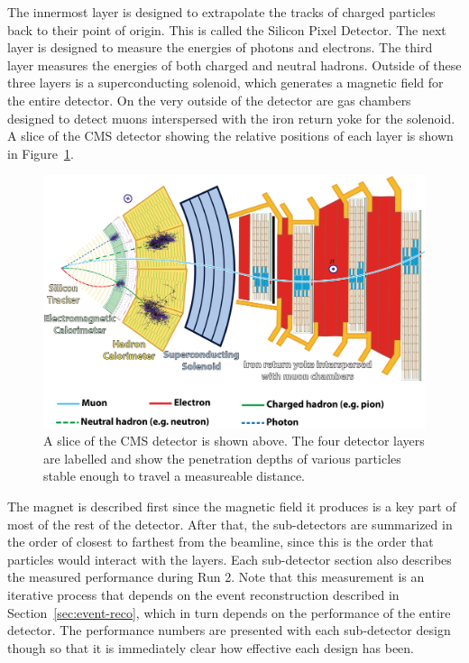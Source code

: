 The innermost layer is designed to extrapolate the tracks of charged particles
back to their point of origin.
This is called the Silicon Pixel Detector.
The next layer is designed to measure the energies of photons and electrons.
The third layer measures the energies of both charged and neutral hadrons.
Outside of these three layers is a superconducting solenoid,
which generates a magnetic field for the entire detector.
On the very outside of the detector are gas chambers designed to detect muons
interspersed with the iron return yoke for the solenoid.
A slice of the CMS detector showing the relative positions of each layer
is shown in Figure~\ref{fig:slice}.
\begin{figure}
  \centering
  \includegraphics[width=0.9\linewidth]{figures/CMSslice_whiteBackground.png}
  \caption[CMS detector slice]{
    A slice of the CMS detector is shown above\cite{Barney:2120661}.
    The four detector layers are labelled and show the penetration
    depths of various particles stable enough to travel a measureable distance.
    }
  \label{fig:slice}
\end{figure}

The magnet is described first since the magnetic field it produces is a key
part of most of the rest of the detector.
After that, the sub-detectors are summarized in the order of closest to farthest
from the beamline, since this is the order that particles would interact with the layers.
Each sub-detector section also describes the measured performance during Run 2.
Note that this measurement is an iterative process that depends on the event reconstruction
described in Section~\ref{sec:event-reco},
which in turn depends on the performance of the entire detector.
The performance numbers are presented with each sub-detector design though so that
it is immediately clear how effective each design has been.

